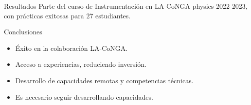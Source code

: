 \begin{frame}{Resultados}
Parte del curso de Instrumentación en LA-CoNGA physics 2022-2023, con prácticas exitosas para 27 estudiantes.
\end{frame}

\begin{frame}{Conclusiones}
\begin{itemize}
    \item Éxito en la colaboración LA-CoNGA.
    \item Acceso a experiencias, reduciendo inversión.
    \item Desarrollo de capacidades remotas y competencias técnicas.
    \item Es necesario seguir desarrollando capacidades.
\end{itemize}
\end{frame}